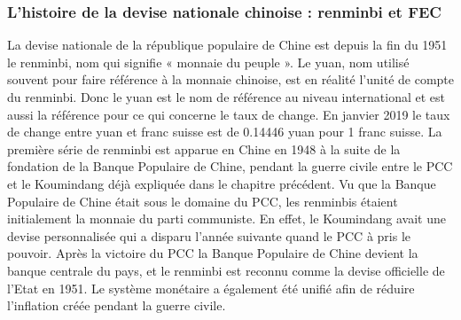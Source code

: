 \subsubsection{L’histoire de la devise nationale chinoise : renminbi et FEC}
La devise nationale de la république populaire de Chine est depuis la fin du 1951 le renminbi, nom qui signifie « monnaie du peuple ».  Le yuan, nom utilisé souvent pour faire référence à la monnaie chinoise, est en réalité l’unité de compte du renminbi.  Donc le yuan est le nom de référence au niveau international et est aussi la référence pour ce qui concerne le taux de change. En janvier 2019 le taux de change entre yuan et franc suisse est de 0.14446 yuan pour 1 franc suisse. La première série de renminbi est apparue en Chine en 1948 à la suite de la fondation de la Banque Populaire de Chine,  pendant la guerre civile entre le PCC et le Koumindang déjà expliquée dans le chapitre précédent. Vu que la Banque Populaire de Chine était sous le domaine du PCC, les renminbis étaient initialement la monnaie du parti communiste.  En effet, le Koumindang avait une devise personnalisée qui a disparu l’année suivante quand le PCC à pris le pouvoir. Après la victoire du PCC la Banque Populaire de Chine devient la banque centrale du pays, et le renminbi est reconnu comme la devise officielle de l’Etat en 1951. Le système monétaire a également été unifié afin de réduire l’inflation créée pendant la guerre civile.  

